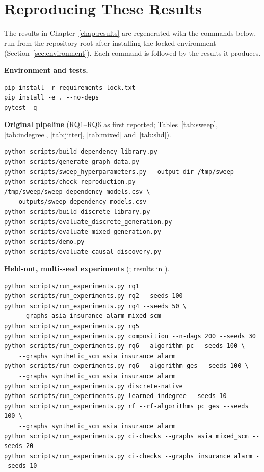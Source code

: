 \documentclass[
  english,
  class=report,
  accentcolor=2c,
  marginpar=false,
  parskip=half-,
  fontsize=11pt,
  ruledheaders=false,
  pdfa=false,
  IMRAD=false,
  thesis={type=master}
]{tudapub}
\begin{document}
\section{Reproducing These Results}
\label{sec:reproduce}
The results in Chapter~\ref{chap:results} are regenerated with the commands
below, run from the repository root after installing the locked environment
(Section~\ref{sec:environment}). Each command is followed by the results it
produces.

\medskip\noindent\textbf{Environment and tests.}
{\footnotesize
\begin{verbatim}
pip install -r requirements-lock.txt
pip install -e . --no-deps
pytest -q
\end{verbatim}
}

\noindent\textbf{Original pipeline} (RQ1--RQ6 as first reported;
Tables~\ref{tab:sweep}, \ref{tab:indegree}, \ref{tab:jitter}, \ref{tab:mixed}
and~\ref{tab:shd}).
{\footnotesize
\begin{verbatim}
python scripts/build_dependency_library.py
python scripts/generate_graph_data.py
python scripts/sweep_hyperparameters.py --output-dir /tmp/sweep
python scripts/check_reproduction.py /tmp/sweep/sweep_dependency_models.csv \
    outputs/sweep_dependency_models.csv
python scripts/build_discrete_library.py
python scripts/evaluate_discrete_generation.py
python scripts/evaluate_mixed_generation.py
python scripts/demo.py
python scripts/evaluate_causal_discovery.py
\end{verbatim}
}

\noindent\textbf{Held-out, multi-seed experiments}
(; results in ).
{\footnotesize
\begin{verbatim}
python scripts/run_experiments.py rq1
python scripts/run_experiments.py rq2 --seeds 100
python scripts/run_experiments.py rq4 --seeds 50 \
    --graphs asia insurance alarm mixed_scm
python scripts/run_experiments.py rq5
python scripts/run_experiments.py composition --n-dags 200 --seeds 30
python scripts/run_experiments.py rq6 --algorithm pc --seeds 100 \
    --graphs synthetic_scm asia insurance alarm
python scripts/run_experiments.py rq6 --algorithm ges --seeds 100 \
    --graphs synthetic_scm asia insurance alarm
python scripts/run_experiments.py discrete-native
python scripts/run_experiments.py learned-indegree --seeds 10
python scripts/run_experiments.py rf --rf-algorithms pc ges --seeds 100 \
    --graphs synthetic_scm asia insurance alarm
python scripts/run_experiments.py ci-checks --graphs asia mixed_scm --seeds 20
python scripts/run_experiments.py ci-checks --graphs insurance alarm --seeds 10
\end{verbatim}
}
\end{document}
